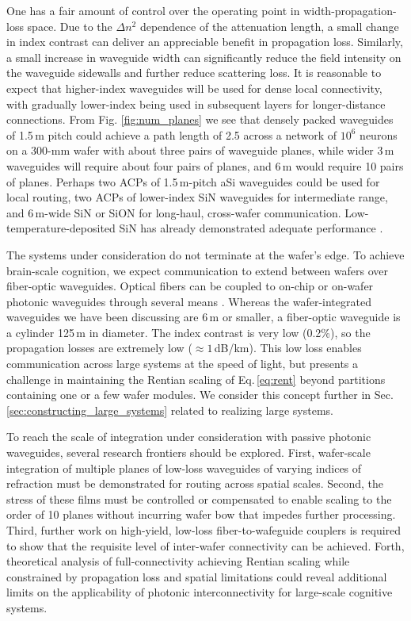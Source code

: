 \documentclass[twocolumn]{article}
\begin{document}
One has a fair amount of control over the operating point in width-propagation-loss space. Due to the $\Delta n^2$ dependence of the attenuation length, a small change in index contrast can deliver an appreciable benefit in propagation loss. Similarly, a small increase in waveguide width can significantly reduce the field intensity on the waveguide sidewalls and further reduce scattering loss. It is reasonable to expect that higher-index waveguides will be used for dense local connectivity, with gradually lower-index being used in subsequent layers for longer-distance connections. From Fig. \ref{fig:num_planes} we see that densely packed waveguides of 1.5\,\textmu m pitch could achieve a path length of 2.5 across a network of $10^6$ neurons on a 300-mm wafer with about three pairs of waveguide planes, while wider 3\,\textmu m waveguides will require about four pairs of planes, and 6\,\textmu m would require 10 pairs of planes. Perhaps two ACPs of 1.5\,\textmu m-pitch aSi waveguides could be used for local routing, two ACPs of lower-index SiN waveguides for intermediate range, and 6\,\textmu m-wide SiN or SiON for long-haul, cross-wafer communication. Low-temperature-deposited SiN has already demonstrated adequate performance \cite{chna2018}.

The systems under consideration do not terminate at the wafer's edge. To achieve brain-scale cognition, we expect communication to extend between wafers over fiber-optic waveguides. Optical fibers can be coupled to on-chip or on-wafer photonic waveguides through several means \cite{Rev1,Rev2,Rev3,khbu2020}. Whereas the wafer-integrated waveguides we have been discussing are 6\,\textmu m or smaller, a fiber-optic waveguide is a cylinder 125\,\textmu m in diameter. The index contrast is very low (0.2\%), so the propagation losses are extremely low ($\approx 1$\,dB/km). This low loss enables communication across large systems at the speed of light, but presents a challenge in maintaining the Rentian scaling of Eq.\,\ref{eq:rent} beyond partitions containing one or a few wafer modules. We consider this concept further in Sec.\,\ref{sec:constructing_large_systems} related to realizing large systems.

To reach the scale of integration under consideration with passive photonic waveguides, several research frontiers should be explored. First, wafer-scale integration of multiple planes of low-loss waveguides of varying indices of refraction must be demonstrated for routing across spatial scales. Second, the stress of these films must be controlled or compensated to enable scaling to the order of 10 planes without incurring wafer bow that impedes further processing. Third, further work on high-yield, low-loss fiber-to-wafeguide couplers is required to show that the requisite level of inter-wafer connectivity can be achieved. Forth, theoretical analysis of full-connectivity achieving Rentian scaling while constrained by propagation loss and spatial limitations could reveal additional limits on the applicability of photonic interconnectivity for large-scale cognitive systems.
\end{document}
